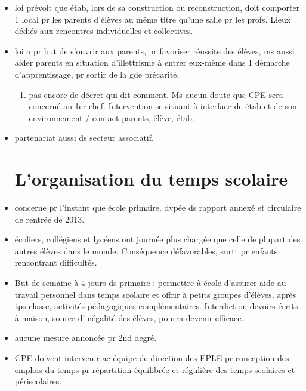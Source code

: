\documentclass[12pt]{report}
\begin{document}
\begin{itemize}
\item  loi prévoit que étab, lors de sa construction ou reconstruction, doit comporter 1 local pr les parents d'élèves au même titre qu'une salle pr les profs. Lieux dédiés aux rencontres individuelles et collectives. \\

\item loi a pr but de s'ouvrir aux parents, pr favoriser réussite des élèves, ms aussi aider parents en situation d’illettrisme à entrer eux-même dans 1 démarche d'apprentissage, pr sortir de la gde précarité. \\
\begin{enumerate}
\item pas encore de décret qui dit comment. Ms aucun doute que CPE sera concerné au 1er chef. Intervention se situant à interface de étab et de son environnement / contact parents, élève, étab.\\
\end{enumerate}

\item partenariat aussi ds secteur associatif.

\section{L'organisation du temps scolaire}

\item concerne pr l'instant que école primaire. dvpée ds rapport annexé et circulaire de rentrée de 2013. \\

\item  écoliers, collégiens et lycéens ont journée plus chargée que celle de plupart des autres élèves dans le monde. Conséquence défavorables, surtt pr enfants rencontrant difficultés. \\

\item But de semaine à 4 jours ds primaire : permettre à école d'assurer aide au travail personnel dans temps scolaire et offrir à petits groupes d'élèves, après tps classe, activités pédagogiques complémentaires.  Interdiction devoirs écrits à maison, source d'inégalité des élèves, pourra devenir efficace. \\

\item aucune mesure annoncée pr 2nd degré.

\item CPE doivent intervenir ac équipe de direction des EPLE pr conception des emplois du temps pr répartition équilibrée et régulière des temps scolaires et périscolaires.


\end{itemize}
\end{document}
